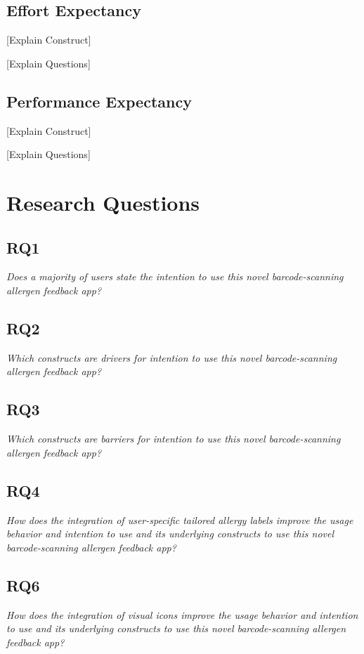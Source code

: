 \subsection{Effort Expectancy}
[Explain Construct]

[Explain Questions]

\subsection{Performance Expectancy}
[Explain Construct]

[Explain Questions]

\section{Research Questions}
\subsection{RQ1}
\textit{\large Does a majority of users state the intention to use this novel barcode-scanning allergen feedback app?}\\



\subsection{RQ2}
\textit{\large 
Which constructs are drivers for intention to use this novel barcode-scanning allergen feedback app?}\\



\subsection{RQ3}
\textit{\large Which constructs are barriers for intention to use this novel barcode-scanning allergen feedback app?}\\



\subsection{RQ4}
\textit{\large How does the integration of user-specific tailored allergy labels improve the usage behavior and intention to use and its underlying constructs to use this novel barcode-scanning allergen feedback app?}\\


\subsection{RQ6}
\textit{\large How does the integration of visual icons improve the usage behavior and intention to use and its underlying constructs to use this novel barcode-scanning allergen feedback app?}\\




